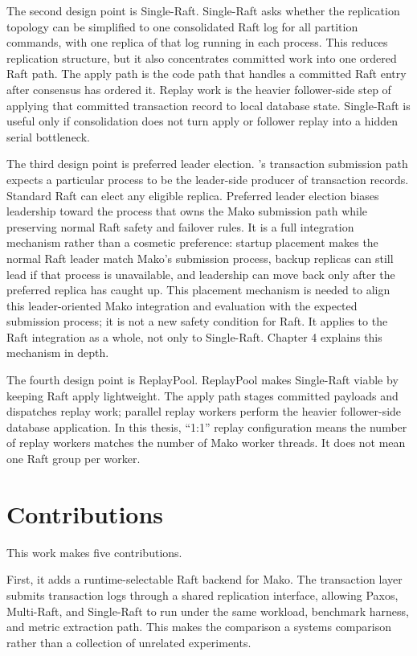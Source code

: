 The second design point is Single-Raft. Single-Raft asks whether the
replication topology can be simplified to one consolidated Raft log for all
partition commands, with one replica of that log running in each process. This
reduces replication structure, but it also concentrates committed work into
one ordered Raft path. The apply path is the code path that handles a committed
Raft entry after consensus has ordered it. Replay work is the heavier
follower-side step of applying that committed transaction record to local
database state. Single-Raft is useful only if consolidation does not turn
apply or follower replay into a hidden serial bottleneck.

The third design point is preferred leader election. \Mako{}'s transaction
submission path expects a particular process to be the leader-side producer of
transaction records. Standard Raft can elect any eligible replica. Preferred
leader election biases leadership toward the process that owns the Mako
submission path while preserving normal Raft safety and failover rules. It is a
full integration mechanism rather than a cosmetic preference: startup
placement makes the normal Raft leader match Mako's submission process, backup
replicas can still lead if that process is unavailable, and leadership can move
back only after the preferred replica has caught up. This placement mechanism
is needed to align this leader-oriented Mako integration and evaluation with
the expected submission process; it is not a new safety condition for Raft. It
applies to the Raft integration as a whole, not only to Single-Raft. Chapter 4
explains this mechanism in depth.

The fourth design point is ReplayPool. ReplayPool makes Single-Raft viable by
keeping Raft apply lightweight. The apply path stages committed payloads and
dispatches replay work; parallel replay workers perform the heavier
follower-side database application. In this thesis, ``1:1'' replay
configuration means the number of replay workers matches the number of Mako
worker threads. It does not mean one Raft group per worker.

\section{Contributions}

This work makes five contributions.

First, it adds a runtime-selectable Raft backend for Mako. The transaction
layer submits transaction logs through a shared replication interface, allowing
Paxos, Multi-Raft, and Single-Raft to run under the same workload, benchmark
harness, and metric extraction path. This makes the comparison a systems
comparison rather than a collection of unrelated experiments.

